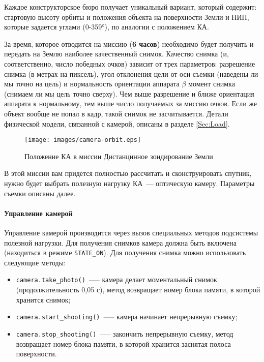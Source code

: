 \documentclass[12pt,a4paper]{article}
\begin{document}
Каждое конструкторское бюро получает уникальный вариант, который содержит: стартовую
высоту орбиты и положения объекта на поверхности Земли и НИП, которые задается углами
(0-359°), по аналогии с положением КА.

За время, которое отводится на миссию (\textbf{6 часов}) необходимо будет получить и
передать на Землю наиболее качественный снимок. Качество снимка (и, соответственно, число
победных очков) зависит от трех параметров: разрешение снимка (в метрах на пиксель), угол
отклонения цели от оси съемки (наведены ли мы точно на цель) и нормальность ориентации
аппарата $\beta$ момент снимка (снимаем ли мы цель точно сверху). Чем выше разрешение и ближе
ориентация аппарата к нормальному, тем выше число получаемых за миссию очков. Если же
объект вообще не попал в кадр, такой снимок не засчитывается. Детали физической модели,
связанной с камерой, описаны в разделе \ref{Sec:Load}.

\begin{figure}[tbh]
  \begin{center}
    \texttt{[image: images/camera-orbit.eps]}
    \caption{Положение КА в миссии Дистанцинное зондирование Земли}
    \label{Pic:Camera-DZZ}
  \end{center}
\end{figure}

В этой миссии вам придется полностью рассчитать и сконструировать спутник, нужно будет
выбрать полезную нагрузку КА~--- оптическую камеру. Параметры съемки описаны далее.

\paragraph{Управление камерой}

Управление камерой производится через вызов специальных методов подсистемы полезной
нагрузки. Для получения снимков камера должна быть включена (находиться в режиме
\verb'STATE_ON'). Для получения снимка можно использовать следующие методы:

\begin{itemize}
\item \verb'camera.take_photo()'~--— камера делает моментальный снимок (продолжительность
  0,05 с), метод возвращает номер блока памяти, в которой хранится снимок;
\item \verb'camera.start_shooting()'~--— камера начинает непрерывную съемку;
\item \verb'camera.stop_shooting()'~--— закончить непрерывную съемку, метод возвращает
  номер блока памяти, в которой хранится заснятая полоса поверхности.
\end{itemize}
\end{document}
